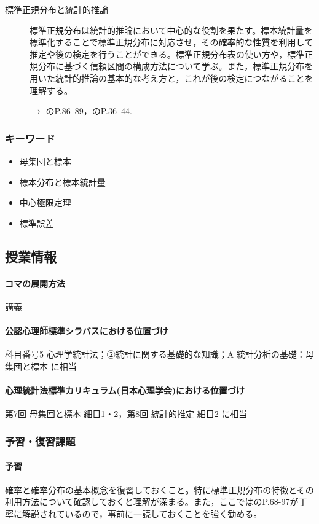 \begin{description}
	\item[標準正規分布と統計的推論] 標準正規分布は統計的推論において中心的な役割を果たす。標本統計量を標準化することで標準正規分布に対応させ，その確率的な性質を利用して推定や後の検定を行うことができる。標準正規分布表の使い方や，標準正規分布に基づく信頼区間の構成方法について学ぶ。また，標準正規分布を用いた統計的推論の基本的な考え方と，これが後の検定につながることを理解する。
	      \begin{flushright}
		      $\to$ \textcite{Yamada2004}のP.86--89，\textcite{Kawabata201408}のP.36--44.
	      \end{flushright}
\end{description}
\subsubsection{キーワード}
\begin{itemize}
	\item 母集団と標本
	\item 標本分布と標本統計量
	\item 中心極限定理
	\item 標準誤差
\end{itemize}
\subsection{授業情報}
\paragraph{コマの展開方法}
講義
\paragraph{公認心理師標準シラバスにおける位置づけ}
科目番号5 心理学統計法；②統計に関する基礎的な知識；A 統計分析の基礎：母集団と標本 に相当
\paragraph{心理統計法標準カリキュラム(日本心理学会)における位置づけ}
第7回 母集団と標本 細目1・2，第8回 統計的推定 細目2 に相当
\subsubsection{予習・復習課題}
\paragraph{予習}
確率と確率分布の基本概念を復習しておくこと。特に標準正規分布の特徴とその利用方法について確認しておくと理解が深まる。また，ここでは\textcite{Yamada2004}のP.68-97が丁寧に解説されているので，事前に一読しておくことを強く勧める。
